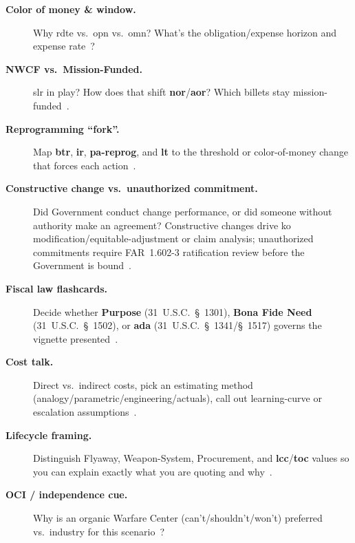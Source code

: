 \documentclass[../main.tex]{subfiles}
\begin{document}
\begin{description}
  \item[\textbf{Color of money \& window.}] Why \ac{rdte} vs.\ \ac{opn} vs.\ \ac{omn}? What's the obligation/expense horizon and expense rate~\autocite{DoDFMR-Vol2A-Ch1,DoDFMR-Vol3-Ch8}?
  \item[\textbf{NWCF vs.\ Mission-Funded.}] \ac{slr} in play? How does that shift \textbf{\ac{nor}}/\textbf{\ac{aor}}? Which billets stay mission-funded~\autocite{DoDFMR-Vol11B-Ch1,DoDFMR-Vol11B-Ch3}.
  \item[\textbf{Reprogramming ``fork''.}] Map \textbf{\ac{btr}}, \textbf{\ac{ir}}, \textbf{\ac{pa-reprog}}, and \textbf{\ac{lt}} to the threshold or color-of-money change that forces each action~\autocite{DoDFMR-Vol3-Ch6}.
  \item[\textbf{Constructive change vs.\ unauthorized commitment.}] Did Government conduct change performance, or did someone without authority make an agreement? Constructive changes drive \ac{ko} modification/equitable-adjustment or claim analysis; unauthorized commitments require FAR~1.602-3 ratification review before the Government is bound~\autocite{FAR-1-602-3-Ratification,FAR-43-103-Contract-Modifications,SOM-Ch3-2023,NAVSEA-Contracts-Handbook-2023}.
  \item[\textbf{Fiscal law flashcards.}] Decide whether \textbf{Purpose} (31~U.S.C.~\S~1301), \textbf{Bona Fide Need} (31~U.S.C.~\S~1502), or \textbf{\ac{ada}} (31~U.S.C.~\S~1341/\S~1517) governs the vignette presented~\autocite{USC-1301-Purpose,USC-1502-BFN,USC-1341-ADA,USC-1517-ADA}.
  \item[\textbf{Cost talk.}] Direct vs.\ indirect costs, pick an estimating method (analogy/parametric/engineering/actuals), call out learning-curve or escalation assumptions~\autocite{edo-3-1-6-cost-estimating-2024,DoDFMR-Vol11B-Ch12}.
  \item[\textbf{Lifecycle framing.}] Distinguish Flyaway, Weapon-System, Procurement, and \textbf{\ac{lcc}}/\textbf{\ac{toc}} values so you can explain exactly what you are quoting and why~\autocite{edo-3-1-6-cost-estimating-2024,DoDI5000-85,SECNAV5000-2G}.
  \item[\textbf{OCI / independence cue.}] Why is an organic Warfare Center (can't/shouldn't/won't) preferred vs.\ industry for this scenario~\autocite{SECNAV5400-15D}?
\end{description}
\end{document}
